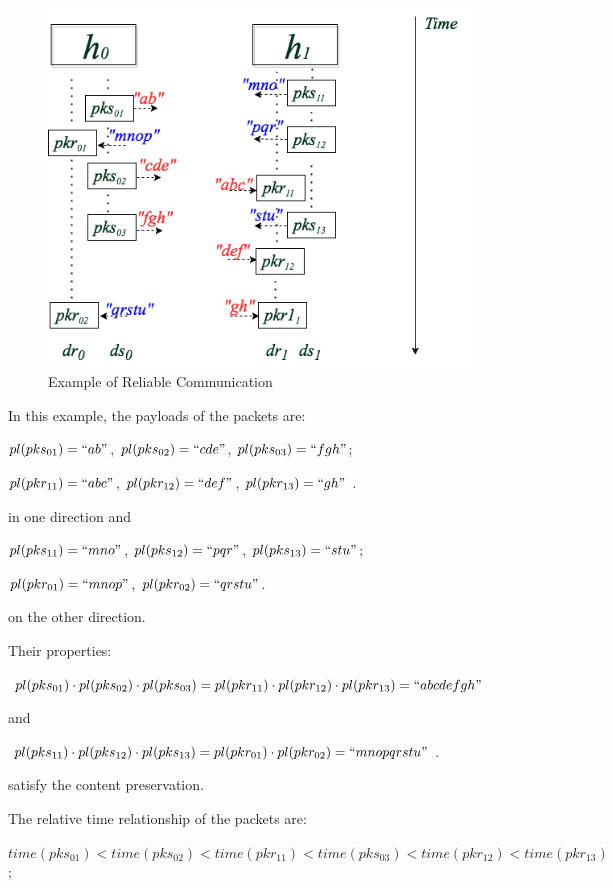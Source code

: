 \begin{figure}[H]
\centerline{\includegraphics[scale=0.5]{Figures/reliableexample}}
\caption{Example of Reliable Communication}
\label{reliableexample}
\end{figure}

In this example, the payloads of the packets are:

$pl(pks_{01})=``ab"$, $ pl(pks_{02})=``cde"$, $pl(pks_{03})=``fgh"$;

$pl(pkr_{11})=``abc"$, $pl(pkr_{12})=``def"$, $pl(pkr_{13})=``gh"$ .

in one direction and 

$pl(pks_{11})=``mno"$, $pl(pks_{12})=``pqr"$, $pl(pks_{13})=``stu"$;

$pl(pkr_{01})=``mnop"$, $pl(pkr_{02})=``qrstu"$. 

on the other direction. 

Their properties:

$pl(pks_{01}) \cdot pl(pks_{02}) \cdot pl(pks_{03}) = pl(pkr_{11}) \cdot pl(pkr_{12}) \cdot pl(pkr_{13}) = ``abcdefgh"$ 

and

$pl(pks_{11}) \cdot pl(pks_{12}) \cdot pl(pks_{13}) = pl(pkr_{01}) \cdot pl(pkr_{02}) = ``mnopqrstu"$. 

satisfy the content preservation. 

The relative time relationship of the packets are: 

$time(pks_{01}) < time(pks_{02}) < time(pkr_{11})< time(pks_{03}) < time(pkr_{12}) < time(pkr_{13}) $;

